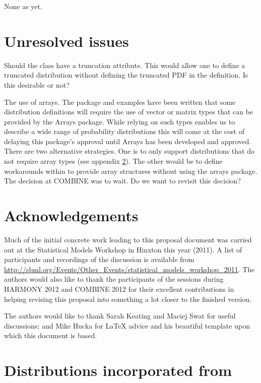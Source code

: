 \documentclass[draftspec]{sbmlpkgspec}
\begin{document}
None as yet.

\section{Unresolved issues}
\label{sec:unresolved}

\begin{description}
\item Should the  class have a truncation
  attribute. This would allow one to define a truncated distribution
  without defining the truncated PDF in the \mathml definition. Is
  this desirable or not?
\item The use of arrays. The package and examples have been written
  that some distribution definitions will require the use of vector or
  matrix types that can be provided by the Arrays package. While
  relying on such types enables us to describe a wide range of
  probability distributions this will come at the cost of delaying
  this package's approval until Arrays has been developed and
  approved. There are two alternative strategies. One is to only
  support distributions that do not require array types (see appendix
  \ref{sec:uncertmlusage}). The other would be to define workarounds
  within \distribshort to provide array structures without using the
  arrays package. The decision at COMBINE was to wait. Do we want to
  revisit this decision?
\end{description}

\section{Acknowledgements}
\label{sec:uncertmlusage}

Much of the initial concrete work leading to this proposal document
was carried out at the Statistical Models Workshop in Hinxton this
year (2011). A list of participants and recordings of the discussion
is available from
\url{http://sbml.org/Events/Other_Events/statistical_models_workshop_2011}.
The authors would also like to thank the participants of the
\distribshort sessions during HARMONY 2012 and COMBINE 2012 for their excellent
contributions in helping revising this proposal into something a lot
closer to the finished version.

The authors would like to thank Sarah Keating and Maciej Swat for
useful discussions; and Mike Hucka for \LaTeX{} advice and his
beautiful template upon which this document is based.

\appendix
\section{Distributions incorporated from \uncertml}
\end{document}
